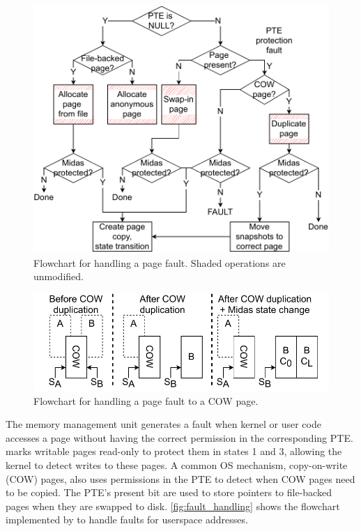 \documentclass[letterpaper,twocolumn,10pt]{article}
\begin{document}
\begin{figure}[h]
  \centering
  \includegraphics[width=\linewidth]{img/pagefault.pdf}
  \caption{Flowchart for handling a page fault. Shaded
          operations are unmodified.}
  \label{fig:fault_handling}
\end{figure}

\begin{figure}[h]
  \centering
  \includegraphics[width=\linewidth]{img/pagefault_cow.pdf}
  \caption{Flowchart for handling a page fault to a COW page.}
  \label{fig:fault_handling_cow}
\end{figure}

The memory management unit generates a fault when kernel or user code accesses
a page without having the correct permission in the corresponding PTE.
\midas marks writable pages read-only to protect them in
states 1 and 3, allowing the kernel to detect writes to these pages.
A common OS mechanism, copy-on-write (COW) pages, also uses
permissions in the PTE to detect when COW pages need to be copied.
The PTE's present bit are used to store pointers to file-backed pages
when they are swapped to disk.
\autoref{fig:fault_handling} shows the flowchart implemented by
 to handle faults for userspace addresses.
\end{document}
